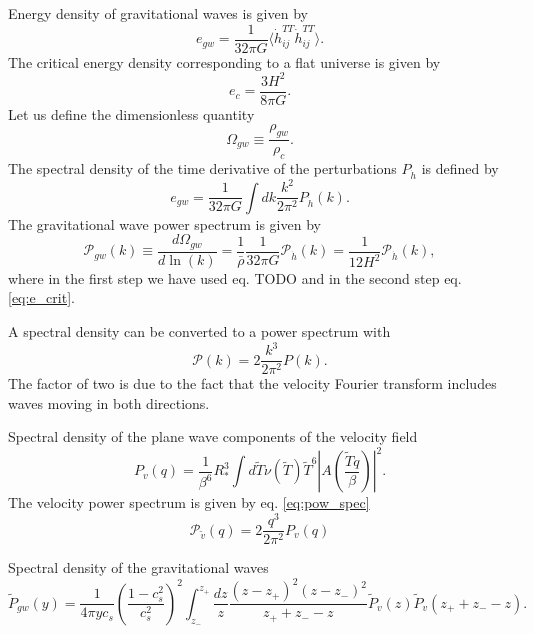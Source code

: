 Energy density of gravitational waves is given by
\begin{equation}
e_{gw} = \frac{1}{32 \pi G} \langle \dot{h}_{ij}^{TT} \dot{h}_{ij}^{TT} \rangle.
\end{equation}
\cites[eq. 3]{hindmarsh_gw_pt_2019}[eq. 1.135, 7.193]{maggiore_gw_2008}
The critical energy density corresponding to a flat universe is given by
\begin{equation}
e_c = \frac{3 H^2}{8 \pi G}.
\label{eq:e_crit}
\end{equation}
Let us define the dimensionless quantity
\begin{equation}
\Omega_{gw} \equiv \frac{\rho_{gw}}{\rho_c}.
\end{equation}
The spectral density of the time derivative of the perturbations $P_{\dot{h}}$ is defined by
\begin{equation}
e_{gw} = \frac{1}{32 \pi G} \int dk \frac{k^2}{2 \pi^2} P_{\dot{h}}(k).
\end{equation}
The gravitational wave power spectrum is given by
\begin{equation}
\mathcal{P}_{gw}(k)
\equiv \frac{d \Omega_{gw}}{d \ln (k)}
= \frac{1}{\bar{\rho}} \frac{1}{32 \pi G} \mathcal{P}_{\dot{h}}(k)
= \frac{1}{12 H^2} \mathcal{P}_{\dot{h}}(k),
\end{equation}
where in the first step we have used eq. TODO and in the second step eq. \eqref{eq:e_crit}.

A spectral density can be converted to a power spectrum with
\begin{equation}
\mathcal{P}(k) = 2 \frac{k^3}{2 \pi^2} P(k).
\label{eq:pow_spec}
\end{equation}
The factor of two is due to the fact that the velocity Fourier transform includes waves moving in both directions.

Spectral density of the plane wave components of the velocity field \cite[eq. 4.17]{hindmarsh_gw_pt_2019}
\begin{equation}
P_v(q) = \frac{1}{\beta^6}{R_*^3} \int d\tilde{T} \nu(\tilde{T}) \tilde{T}^6 |A(\frac{\tilde{T}q}{\beta})|^2.
\end{equation}
The velocity power spectrum is given by eq. \eqref{eq:pow_spec} \cite[eq. 4.18]{hindmarsh_gw_pt_2019}
\begin{equation}
\mathcal{P}_{\tilde{v}} (q) = 2 \frac{q^3}{2\pi^2} P_v(q)
\end{equation}

Spectral density of the gravitational waves \cite[eq. 3.47]{hindmarsh_gw_pt_2019}
\begin{equation}
\tilde{P}_{gw}(y)
= \frac{1}{4 \pi y c_s}
\left( \frac{1 - c_s^2}{c_s^2} \right)^2
\int_{z_-}^{z_+} \frac{dz}{z}
\frac{(z-z_+)^2(z-z_-)^2}{z_+ + z_- - z}
\tilde{P}_v (z) \tilde{P}_v (z_+ + z_- - z).
\end{equation}

\cites{hindmarsh_gw_pt_2019}[ch. 8]{lecture_notes}
